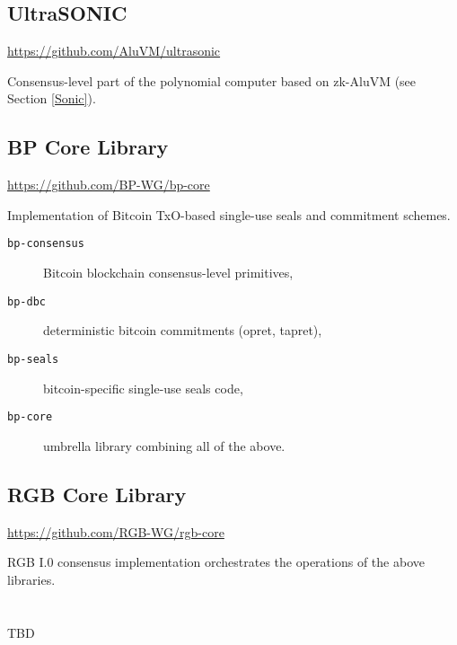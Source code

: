 \documentclass[9pt,oneside]{amsart}
\begin{document}
\subsection{UltraSONIC}

\url{https://github.com/AluVM/ultrasonic}

Consensus-level part of the polynomial computer based on zk-AluVM (see Section \ref{Sonic}).

\subsection{BP Core Library}
    
\url{https://github.com/BP-WG/bp-core}

Implementation of Bitcoin TxO-based single-use seals and commitment schemes.

\begin{description}
    \item[\texttt{bp-consensus}]  Bitcoin blockchain consensus-level primitives,
    \item[\texttt{bp-dbc}] deterministic bitcoin commitments (opret, tapret),
    \item[\texttt{bp-seals}] bitcoin-specific single-use seals code,
    \item[\texttt{bp-core}] umbrella library combining all of the above.
\end{description}

\subsection{RGB Core Library}

\url{https://github.com/RGB-WG/rgb-core}

RGB I.0 consensus implementation orchestrates the operations of the above libraries.


\newpage
\section{}\label{ap:gloss}
\printglossaries

TBD
\end{document}
